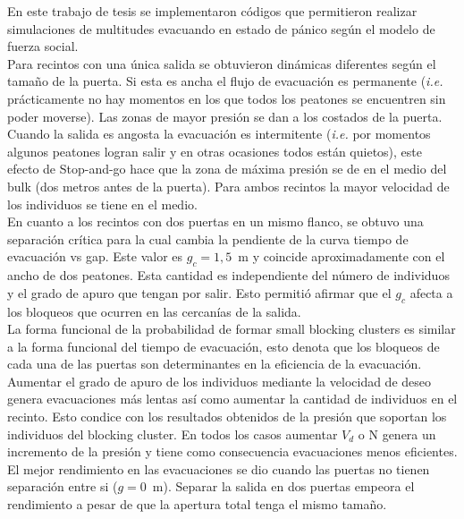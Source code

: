 En este trabajo de tesis se implementaron códigos que permitieron realizar simulaciones de multitudes evacuando en estado de pánico según el modelo de fuerza social. \\

Para recintos con una única salida se obtuvieron dinámicas diferentes según el tamaño de la puerta. Si esta es ancha el flujo de evacuación es permanente (\emph{i.e.} prácticamente no hay momentos en los que todos los peatones se encuentren sin poder moverse). Las zonas de mayor presión se dan a los costados de la puerta. Cuando la salida es angosta la evacuación es intermitente (\emph{i.e.} por momentos algunos peatones logran salir y en otras ocasiones todos están quietos), este efecto de Stop-and-go hace que la zona de máxima presión se de en el medio del bulk (dos metros antes de la puerta). 
Para ambos recintos la mayor velocidad de los individuos se tiene en el medio. \\

En cuanto a los recintos con dos puertas en un mismo flanco, se obtuvo  una separación crítica para la cual cambia la pendiente de la curva tiempo de evacuación vs gap. Este valor es $g_c=1,5$~m y coincide aproximadamente con el ancho de dos peatones. Esta cantidad es independiente del número de individuos y el grado de apuro que tengan por salir. Esto permitió afirmar que el $g_c$ afecta a los bloqueos que ocurren en las cercanías de la salida. \\

La forma funcional de la probabilidad de formar small blocking clusters es similar a la forma funcional del tiempo de evacuación, esto denota que los bloqueos de cada una de las puertas son determinantes en la eficiencia de la evacuación. \\

Aumentar el grado de apuro de los individuos mediante la velocidad de deseo genera evacuaciones más lentas así como aumentar la cantidad de individuos en el recinto. Esto condice con los resultados obtenidos de la presión que soportan los individuos del blocking cluster. En todos los casos aumentar $V_d$ o N genera un incremento de la presión y tiene como consecuencia evacuaciones menos eficientes.\\

El mejor rendimiento en las evacuaciones se dio cuando las puertas no tienen separación entre si ($g=0$~m). Separar la salida en dos puertas empeora el rendimiento a pesar de que la apertura total tenga el mismo tamaño.   
